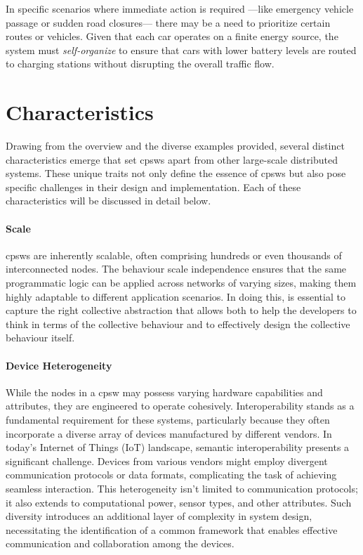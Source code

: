 In specific scenarios where immediate action is required
 ---like emergency vehicle passage or sudden road closures---
 there may be a need to prioritize certain routes or vehicles. 
 Given that each car operates on a finite energy source, the system must \emph{self-organize} to ensure that cars with lower battery levels are routed to charging stations without disrupting the overall traffic flow.

\section{Characteristics}
Drawing from the overview and the diverse examples provided, 
 several distinct characteristics emerge that set \acp{cpsw} apart from other large-scale 
 distributed systems. 
% 
These unique traits not only define the essence of \acp{cpsw} but also pose specific challenges in their design and implementation. 
 Each of these characteristics will be discussed in detail below.

\paragraph*{Scale}
\acp{cpsw} are inherently scalable, 
 often comprising hundreds or even thousands of interconnected nodes. 
 The behaviour scale independence ensures that the same programmatic logic can be applied across networks of varying sizes, 
 making them highly adaptable to different application scenarios.
 In doing this, is essential to capture the right collective abstraction that 
 allows both to help the developers to think in terms of the collective behaviour
 and to effectively design the collective behaviour itself.

\paragraph*{Device Heterogeneity}
While the nodes in a \ac{cpsw} may possess varying hardware capabilities and attributes, they are engineered to operate cohesively. Interoperability stands as a fundamental requirement for these systems, particularly because they often incorporate a diverse array of devices manufactured by different vendors. In today's Internet of Things (IoT) landscape, semantic interoperability presents a significant challenge. Devices from various vendors might employ divergent communication protocols or data formats, complicating the task of achieving seamless interaction. This heterogeneity isn't limited to communication protocols; it also extends to computational power, sensor types, and other attributes. Such diversity introduces an additional layer of complexity in system design, necessitating the identification of a common framework that enables effective communication and collaboration among the devices.
